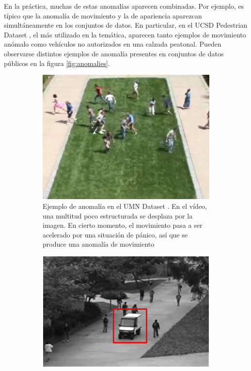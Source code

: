 \documentclass[../main.tex]{memoir}
\begin{document}
En la práctica, muchas de estas anomalías aparecen combinadas. Por
ejemplo, es típico que la anomalía de movimiento y la de apariencia
aparezcan simultáneamente en los conjuntos de datos. En particular, en
el UCSD Pedestrian Dataset \cite{mahadevan2010anomaly}, el más
utilizado en la temática, aparecen tanto ejemplos de movimiento
anómalo como vehículos no autorizados en una calzada peatonal. Pueden
observarse distintos ejemplos de anomalía presentes en conjuntos de
datos públicos en la figura \ref{fig:anomalies}.

\begin{figure}[hbtp]
  \centering
  \begin{subfigure}{0.48\textwidth}
    \centering
    \includegraphics[width=.9\linewidth]{images/umn-anomaly}
    \caption{Ejemplo de anomalía en el UMN Dataset
      \cite{mehran2009abnormal}. En el vídeo, una multitud poco
      estructurada se desplaza por la imagen. En cierto momento, el
      movimiento pasa a ser acelerado por una situación de pánico, así
      que se produce una anomalía de movimiento}
  \end{subfigure}
  \begin{subfigure}{0.48\textwidth}
    \centering
    \includegraphics[width=.9\linewidth]{images/ucsd-anomaly}

\end{subfigure}
\end{figure}
\end{document}
